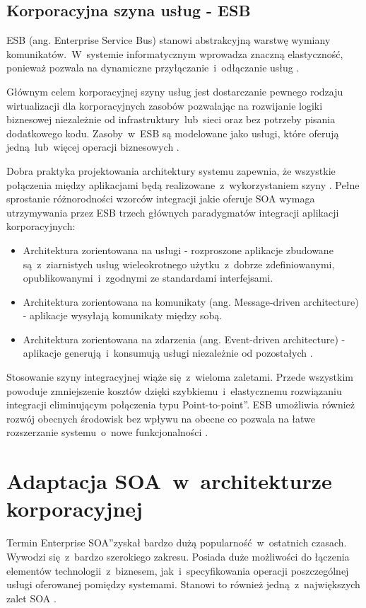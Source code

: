 \subsection{Korporacyjna szyna usług - ESB}
ESB (ang. Enterprise Service Bus) stanowi abstrakcyjną warstwę wymiany komunikatów.~W~systemie informatycznym wprowadza znaczną elastyczność, ponieważ pozwala na dynamiczne przyłączanie~i~odłączanie usług \cite{PlatIntGor}.

Głównym celem korporacyjnej szyny usług jest dostarczanie pewnego rodzaju wirtualizacji dla korporacyjnych zasobów pozwalając na rozwijanie logiki biznesowej niezależnie od infrastruktury~lub~sieci oraz bez potrzeby pisania dodatkowego kodu. Zasoby~w~ESB są modelowane jako usługi, które oferują jedną~lub~więcej operacji biznesowych \cite{IBMRBSoaPat}.

Dobra praktyka projektowania architektury systemu zapewnia, że wszystkie połączenia między aplikacjami będą realizowane~z~wykorzystaniem szyny \cite{PlatIntGor}. Pełne sprostanie różnorodności wzorców integracji jakie oferuje SOA wymaga utrzymywania przez ESB trzech głównych paradygmatów integracji aplikacji korporacyjnych:
\begin{itemize}
\item{Architektura zorientowana na usługi - rozproszone aplikacje zbudowane są~z~ziarnistych usług wieleokrotnego użytku~z~dobrze zdefiniowanymi, opublikowanymi~i~zgodnymi ze standardami interfejsami.}
\item{Architektura zorientowana na komunikaty (ang. Message-driven architecture) - aplikacje wysyłają komunikaty między sobą.}
\item{Architektura zorientowana na zdarzenia (ang. Event-driven architecture) - aplikacje generują~i~konsumują usługi niezależnie od pozostałych \cite{IBMRBSoaPat}.} 
\end{itemize}

Stosowanie szyny integracyjnej wiąże się~z~wieloma zaletami. Przede wszystkim powoduje zmniejszenie kosztów dzięki szybkiemu~i~elastycznemu rozwiązaniu integracji eliminującym połączenia typu \quotedblbase Point-to-point\textquotedblright. ESB umożliwia również rozwój obecnych środowisk bez wpływu na obecne co pozwala na łatwe rozszerzanie systemu~o~nowe funkcjonalności \cite{IBMRBSoaPat}.

\section{Adaptacja SOA~w~architekturze korporacyjnej}
Termin \quotedblbase Enterprise SOA\textquotedblright zyskał bardzo dużą popularność~w~ostatnich czasach. Wywodzi się~z~bardzo szerokiego zakresu. Posiada duże możliwości do łączenia elementów technologii~z~biznesem, jak~i~specyfikowania operacji poszczególnej usługi oferowanej pomiędzy systemami. Stanowi to również jedną~z~największych zalet SOA \cite{EntSOACoryCanSoaML}. 

